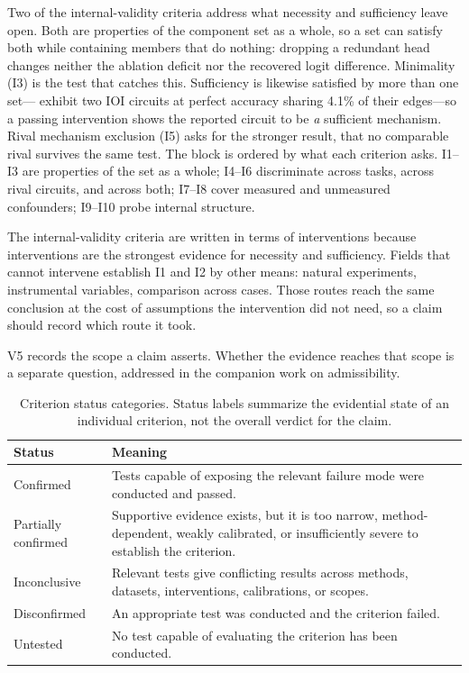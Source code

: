 \documentclass{article}
\begin{document}
Two of the internal-validity criteria address what necessity and sufficiency leave open. Both are properties of the component set as a whole, so a set can satisfy both while containing members that do nothing: dropping a redundant head changes neither the ablation deficit nor the recovered logit difference. Minimality (I3) is the test that catches this. Sufficiency is likewise satisfied by more than one set---\citet{chen2026circuits} exhibit two IOI circuits at perfect accuracy sharing 4.1\% of their edges---so a passing intervention shows the reported circuit to be \emph{a} sufficient mechanism. Rival mechanism exclusion (I5) asks for the stronger result, that no comparable rival survives the same test. The block is ordered by what each criterion asks. I1--I3 are properties of the set as a whole; I4--I6 discriminate across tasks, across rival circuits, and across both; I7--I8 cover measured and unmeasured confounders; I9--I10 probe internal structure.

The internal-validity criteria are written in terms of interventions because interventions are the strongest evidence for necessity and sufficiency. Fields that cannot intervene establish I1 and I2 by other means: natural experiments, instrumental variables, comparison across cases. Those routes reach the same conclusion at the cost of assumptions the intervention did not need, so a claim should record which route it took.

V5 records the scope a claim asserts. Whether the evidence reaches that scope is a separate question, addressed in the companion work on admissibility.




\begingroup
{}
\begin{table}[H]
\centering
\small
\caption{Criterion status categories. Status labels summarize the evidential state of an individual criterion, not the overall verdict for the claim.}
\label{tab:criterion-status}
\renewcommand{\arraystretch}{1.15}
\begin{tabular}{@{}lp{10.5cm}@{}}
\toprule
\textbf{Status} & \textbf{Meaning} \\
\midrule
Confirmed & Tests capable of exposing the relevant failure mode were conducted and passed. \\
\midrule
Partially confirmed  & Supportive evidence exists, but it is too narrow, method-dependent, weakly calibrated, or insufficiently severe to establish the criterion. \\
\midrule
Inconclusive & Relevant tests give conflicting results across methods, datasets, interventions, calibrations, or scopes. \\
\midrule
Disconfirmed & An appropriate test was conducted and the criterion failed. \\
\midrule
Untested & No test capable of evaluating the criterion has been conducted. \\
\bottomrule
\end{tabular}
\end{table}
\endgroup
\end{document}
